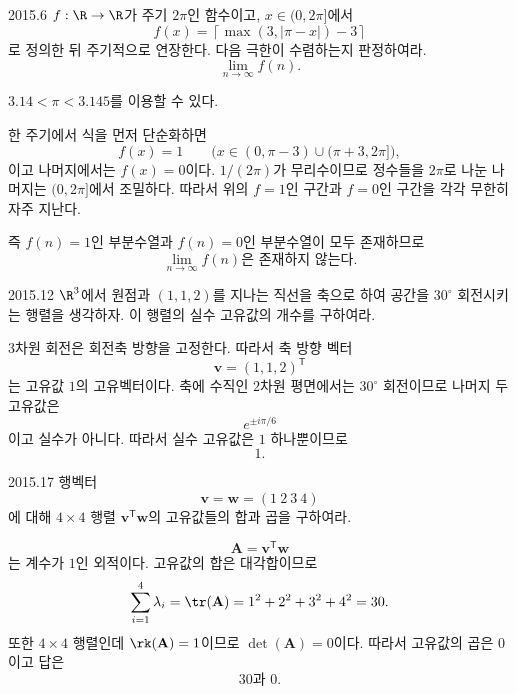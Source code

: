 \begin{pastproblem}{2015.6}
$f:\R\to\R$가 주기 $2\pi$인 함수이고, $x\in(0,2\pi]$에서
\[
f(x)=\left\lceil\max(3,|\pi-x|)-3\right\rceil
\]
로 정의한 뒤 주기적으로 연장한다. 다음 극한이 수렴하는지 판정하여라.
\[
\lim_{n\to\infty}f(n).
\]
\begin{hint}
$3.14<\pi<3.145$를 이용할 수 있다.
\end{hint}
\end{pastproblem}

\begin{solution}
한 주기에서 식을 먼저 단순화하면
\[
f(x)=1\qquad\bigl(x\in(0,\pi-3)\cup(\pi+3,2\pi]\bigr),
\]
이고 나머지에서는 $f(x)=0$이다. $1/(2\pi)$가 무리수이므로 정수들을 $2\pi$로 나눈 나머지는 $(0,2\pi]$에서 조밀하다. 따라서 위의 $f=1$인 구간과 $f=0$인 구간을 각각 무한히 자주 지난다.

즉 $f(n)=1$인 부분수열과 $f(n)=0$인 부분수열이 모두 존재하므로
\[
\boxed{\lim_{n\to\infty}f(n)\text{은 존재하지 않는다}}.
\]
\end{solution}

\begin{pastproblem}{2015.12}
$\R^3$에서 원점과 $(1,1,2)$를 지나는 직선을 축으로 하여 공간을 $30^\circ$ 회전시키는 행렬을 생각하자. 이 행렬의 실수 고유값의 개수를 구하여라.
\end{pastproblem}

\begin{solution}
3차원 회전은 회전축 방향을 고정한다. 따라서 축 방향 벡터
\[
\mathbf v=(1,1,2)^{\mathsf T}
\]
는 고유값 $1$의 고유벡터이다. 축에 수직인 $2$차원 평면에서는 $30^\circ$ 회전이므로 나머지 두 고유값은
\[
e^{\pm i\pi/6}
\]
이고 실수가 아니다. 따라서 실수 고유값은 $1$ 하나뿐이므로
\[
\boxed{1}.
\]
\end{solution}

\begin{pastproblem}{2015.17}
행벡터
\[
\mathbf v=\mathbf w=(1\ 2\ 3\ 4)
\]
에 대해 $4\times4$ 행렬 $\mathbf v^{\mathsf T}\mathbf w$의 고유값들의 합과 곱을 구하여라.
\end{pastproblem}

\begin{solution}
\[
\mathbf A=\mathbf v^{\mathsf T}\mathbf w
\]
는 계수가 $1$인 외적이다. 고유값의 합은 대각합이므로
\[
\sum_{i=1}^4\lambda_i
=\tr(\mathbf A)
=1^2+2^2+3^2+4^2=30.
\]
또한 $4\times4$ 행렬인데 $\rk(\mathbf A)=1$이므로 $\det(\mathbf A)=0$이다. 따라서 고유값의 곱은 $0$이고 답은
\[
\boxed{30\text{과 }0}.
\]
\end{solution}

